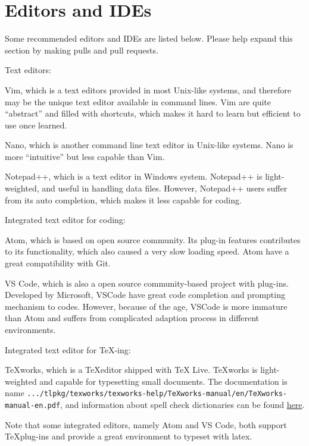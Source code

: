 \documentclass[english]{../TeXTemplate/pkupaper}
\begin{document}
\section{Editors and IDEs}

Some recommended editors and IDEs are listed below. Please help expand this section by making pulls and pull requests.

Text editors:
\begin{partlist}
\item Vim, which is a text editors provided in most Unix-like systems, and therefore may be the unique text editor available in command lines. Vim are quite ``abstract'' and filled with shortcuts, which makes it hard to learn but efficient to use once learned.
\item Nano, which is another command line text editor in Unix-like systems. Nano is more ``intuitive'' but less capable than Vim.
\item Notepad++, which is a text editor in Windows system. Notepad++ is light-weighted, and useful in handling data files. However, Notepad++ users suffer from its auto completion, which makes it less capable for coding.
\end{partlist}

Integrated text editor for coding:
\begin{partlist}
\item Atom, which is based on open source community. Its plug-in features contributes to its functionality, which also caused a very slow loading speed. Atom have a great compatibility with Git.
\item VS Code, which is also a open source community-based project with plug-ins. Developed by Microsoft, VSCode have great code completion and prompting mechanism to codes. However, because of the age, VSCode is more immature than Atom and suffers from complicated adaption process in different environments.
\end{partlist}

Integrated text editor for \TeX-ing:
\begin{partlist}
\item TeXworks, which is a \TeX editor shipped with TeX Live. TeXworks is light-weighted and capable for typesetting small documents. The documentation is name \verb".../tlpkg/texworks/texworks-help/TeXworks-manual/en/TeXworks-manual-en.pdf", and information about spell check dictionaries can be found \href{https://github.com/TeXworks/texworks/wiki/SpellingDictionaries}{here}.
\end{partlist}
Note that some integrated editors, namely Atom and VS Code, both support \TeX plug-ins and provide a great environment to typeset with latex.
\end{document}
